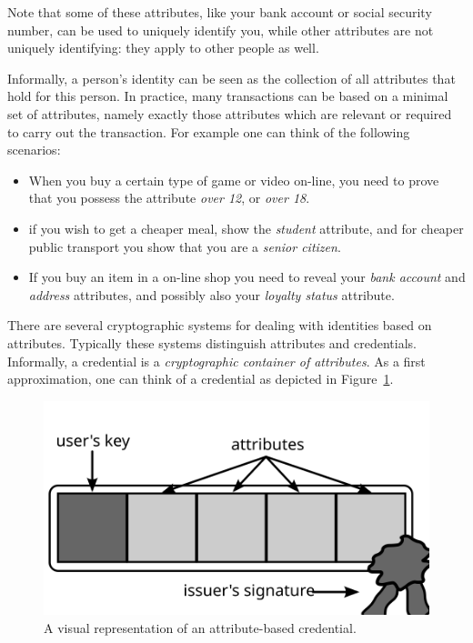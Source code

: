 Note that some of these attributes, like your bank account or social security
number, can be used to uniquely identify you, while other attributes are not
uniquely identifying: they apply to other people as well.

Informally, a person's identity can be seen as the collection of all attributes
that hold for this person. In practice, many transactions can be based on a
minimal set of attributes, namely exactly those attributes which are relevant or
required to carry out the transaction. For example one can think of the
following scenarios:
\begin{itemize}
  \item When you buy a certain type of game or video on-line, you need to
    prove that you possess the attribute \emph{over 12}, or \emph{over 18}.
  \item if you wish to get a cheaper meal, show the \emph{student} attribute,
    and for cheaper public transport you show that you are a \emph{senior
    citizen}.
  \item If you buy an item in a on-line shop you need to reveal your \emph{bank
    account} and \emph{address} attributes, and possibly also your
    \emph{loyalty status} attribute.
\end{itemize}

There are several cryptographic systems for dealing with identities based on
attributes. Typically these systems distinguish attributes and credentials.
Informally, a credential is a \emph{cryptographic container of attributes}. As
a first approximation, one can think of a credential as depicted in
Figure~\ref{fig:Credential}.

\begin{figure}[b]
  \centering
  \includegraphics[scale=.5]{images/credential}
  \caption{A visual representation of an attribute-based credential.}
  \label{fig:Credential}
\end{figure}

